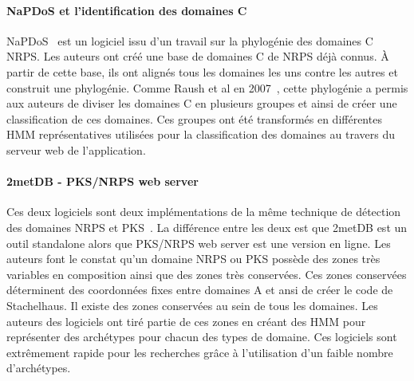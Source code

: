 \documentclass[12pt,french,twoside]{report}
\begin{document}
\paragraph{NaPDoS et l'identification des domaines C}
NaPDoS~\cite{ziemert_natural_2012} est un logiciel issu d'un travail sur la phylogénie des domaines C NRPS.
Les auteurs ont créé une base de domaines C de NRPS déjà connus.
À partir de cette base, ils ont alignés tous les domaines les uns contre les autres et construit une phylogénie.
Comme Raush et al en 2007~\cite{rausch_phylogenetic_2007}, cette phylogénie a permis aux auteurs de diviser les domaines C en plusieurs groupes et ainsi de créer une classification de ces domaines.
Ces groupes ont été transformés en différentes HMM représentatives utilisées pour la classification des domaines au travers du serveur web de l'application.


\paragraph{2metDB - PKS/NRPS web server}
Ces deux logiciels sont deux implémentations de la même technique de détection des domaines NRPS et PKS~\cite{bachmann_chapter_2009}.
La différence entre les deux est que 2metDB est un outil standalone alors que PKS/NRPS web server est une version en ligne.
Les auteurs font le constat qu'un domaine NRPS ou PKS possède des zones très variables en composition ainsi que des zones très conservées.
Ces zones conservées déterminent des coordonnées fixes entre domaines A et ansi de créer le code de Stachelhaus.
Il existe des zones conservées au sein de tous les domaines.
Les auteurs des logiciels ont tiré partie de ces zones en créant des HMM pour représenter des archétypes pour chacun des types de domaine.
Ces logiciels sont extrêmement rapide pour les recherches grâce à l'utilisation d'un faible nombre d'archétypes.


\end{document}
